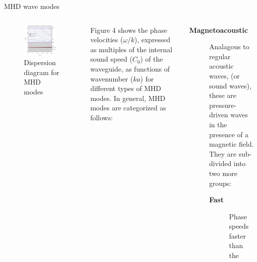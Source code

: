 \documentclass[t]{beamer}
\begin{document}
\begin{frame}[t]
\begin{block}{}
\begin{columns}
        \begin{block}{MHD wave modes}
            \begin{columns}
                \begin{figure}
                    \includegraphics[width=0.9\textwidth]{../disp_diagram.png}
                    \caption{Dispersion diagram for MHD modes}
                \end{figure}
                \textcolor{myblue}{Figure 4} shows the phase velocities ($\omega/k$), expressed as
                multiples of the internal sound speed ($C_0$) of the waveguide,
                as functions of wavenumber ($ka$) for different types
                of MHD modes.
                In general, MHD modes are categorized as follows:
                \par\vspace{5pt}
                \begin{description}
                    \item [\textbf{Magnetoacoustic}] Analagous to regular acoustic
                        waves, (or sound waves), these are pressure-driven
                        waves in the presence of a magnetic field.
                        They are sub-divided into two more groups:
                        \begin{description}
                            \item [\textbf{Fast}] Phase speeds faster than the

\end{description}
\end{description}
\end{columns}
\end{block}
\end{columns}
\end{block}
\end{frame}
\end{document}
